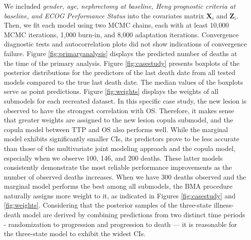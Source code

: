 We included \textit{gender, age, nephrectomy at baseline, Heng prognostic criteria at baseline, and ECOG Performance Status} into the covariates matrix $\textbf{X}_i$ and $\textbf{Z}_i$. Then, we fit each model using two \ac{MCMC}  chains, each with at least 10,000 \ac{MCMC}  iterations, 1,000 burn-in, and 8,000 adaptation iterations.  Convergence diagnostic tests and autocorrelation plots did not show indications of convergence failure. Figure \ref{fig:primaryanalysis} displays the predicted number of deaths at the time of the primary analysis. Figure \ref{fig:casestudy} presents boxplots of the posterior distributions for the predictors of the last death date from all tested models compared to the true last death date. The median values of the boxplots serve as point predictions. Figure \ref{fig:weights} displays the weights of all submodels for each recreated dataset. In this specific case study, the new lesion is observed to have the strongest correlation with OS. Therefore, it makes sense that greater weights are assigned to the new lesion copula submodel, and the copula model between \ac{TTP} and \ac{OS} also performs well. While the marginal model exhibits significantly smaller \ac{CI}s, its predictors prove to be less accurate than those of the multivariate joint modeling approach and the copula model, especially when we observe 100, 146, and 200 deaths. These latter models consistently demonstrate the most reliable performance improvements as the number of observed deaths increases. When we have 300 deaths observed and the marginal model performs the best among all submodels, the \ac{BMA} procedure naturally assigns more weight to it, as indicated in Figures \ref{fig:casestudy} and \ref{fig:weights}. Considering that the posterior samples of the three-state illness-death model are derived by combining predictions from two distinct time periods - randomization to progression and progression to death — it is reasonable for the three-state model to exhibit the widest \ac{CI}s. 

